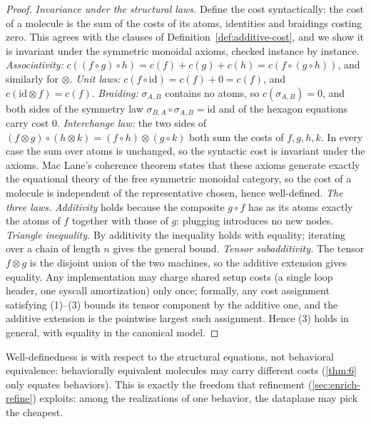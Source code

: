 \begin{proof}
\emph{Invariance under the structural laws.} Define the cost syntactically: the
cost of a molecule is the sum of the costs of its atoms, identities and
braidings costing zero. This agrees with the clauses of
Definition~\ref{def:additive-cost}, and we show it is invariant under the
symmetric monoidal axioms, checked instance by instance. \emph{Associativity:}
$c ((f \circ g) \circ h) = c (f) + c (g) + c (h) = c (f \circ (g \circ h))$, and
similarly for $\otimes$. \emph{Unit laws:} $c (f \circ \mathrm{id}) = c (f) +
0 = c (f)$, and $c (\mathrm{id} \otimes f) = c (f)$. \emph{Braiding:}
$\sigma_{A,B}$ contains no atoms, so $c (\sigma_{A,B}) = 0$, and both sides of
the symmetry law $\sigma_{B,A} \circ \sigma_{A,B} = \mathrm{id}$ and of the
hexagon equations carry cost $0$. \emph{Interchange law:} the two sides of
$(f \otimes g) \circ (h \otimes k) = (f \circ h) \otimes (g \circ k)$ both sum
the costs of $f, g, h, k$. In every case the sum over atoms is unchanged, so
the syntactic cost is invariant under the axioms. Mac Lane's coherence theorem
\cite{maclane} states that these axioms generate exactly the equational theory
of the free symmetric monoidal category, so the cost of a molecule is
independent of the representative chosen, hence well-defined.
\emph{The three laws.} \emph{Additivity} holds because the composite
$g \circ f$ has as its atoms exactly the atoms of $f$ together with those of
$g$: plugging introduces no new nodes. \emph{Triangle inequality.} By
additivity the inequality holds with equality; iterating over a chain of
length $n$ gives the general bound. \emph{Tensor subadditivity.} The tensor
$f \otimes g$ is the disjoint union of the two machines, so the additive
extension gives equality. Any implementation may charge shared setup costs (a
single loop header, one syscall amortization) only once; formally, any cost
assignment satisfying (1)--(3) bounds its tensor component by the additive
one, and the additive extension is the pointwise largest such assignment.
Hence (3) holds in general, with equality in the canonical model.
\end{proof}

\begin{remark}
Well-definedness is with respect to the structural equations, not behavioral
equivalence: behaviorally equivalent molecules may carry different costs (\autoref{thm:6}
only equates behaviors). This is exactly the freedom that refinement
(\autoref{sec:enrich-refine}) exploits: among the realizations of one
behavior, the dataplane may pick the cheapest.
\end{remark}

